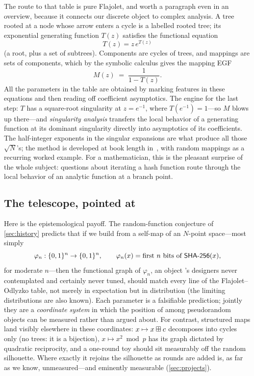 The route to that table is pure Flajolet, and worth a paragraph even in an
overview, because it connects our discrete object to complex analysis. A
tree rooted at a node whose arrow enters a cycle is a labelled rooted
tree; its exponential generating function $T(z)$ satisfies the functional
equation
\[
  T(z) = z\, e^{T(z)}
\]
(a root, plus a set of subtrees). Components are cycles of trees, and
mappings are sets of components, which by the symbolic calculus gives the
mapping EGF
\[
  M(z) \;=\; \frac{1}{1 - T(z)} .
\]
All the parameters in the table are obtained by marking features in these
equations and then reading off coefficient asymptotics. The engine for the
last step: $T$ has a square-root singularity at $z = e^{-1}$, where
$T(e^{-1}) = 1$---so $M$ blows up there---and \emph{singularity analysis}
transfers the local behavior of a generating function at its dominant
singularity directly into asymptotics of its coefficients. The
half-integer exponents in the singular expansions are what produce all
those $\sqrt{N}$'s; the method is developed at book length
in~\citet{FlajoletSedgewick2009}, with random mappings as a recurring
worked example. For a mathematician, this is the pleasant surprise of the
whole subject: questions about iterating a hash function route through
the local behavior of an analytic function at a branch point.

\subsection{The telescope, pointed at \SHA{}}\label{sec:telescope}

Here is the epistemological payoff. The random-function conjecture of
\cref{sec:history} predicts that if we build from \SHA{} a self-map of an
$N$-point space---most simply
\[
  \varphi_n : \{0,1\}^n \to \{0,1\}^n, \qquad
  \varphi_n(x) = \text{first } n \text{ bits of } \textsf{SHA-256}(x),
\]
for moderate $n$---then the functional graph of $\varphi_n$, an object
\SHA{}'s designers never contemplated and certainly never tuned, should
match every line of the Flajolet--Odlyzko table, not merely in expectation
but in distribution (the limiting distributions are also known). Each
parameter is a falsifiable prediction; jointly they are a
\emph{coordinate system} in which the position of \SHA{} among
pseudorandom objects can be measured rather than argued about. For
contrast, structured maps land visibly elsewhere in these coordinates:
$x \mapsto x \boxplus c$ decomposes into cycles only (no trees: it is a
bijection), $x \mapsto x^2 \bmod p$ has its graph dictated by quadratic
reciprocity, and a one-round toy \SHA{} should sit measurably off the
random silhouette. Where exactly it rejoins the silhouette as rounds are
added is, as far as we know, unmeasured---and eminently measurable
(\cref{sec:projects}).

